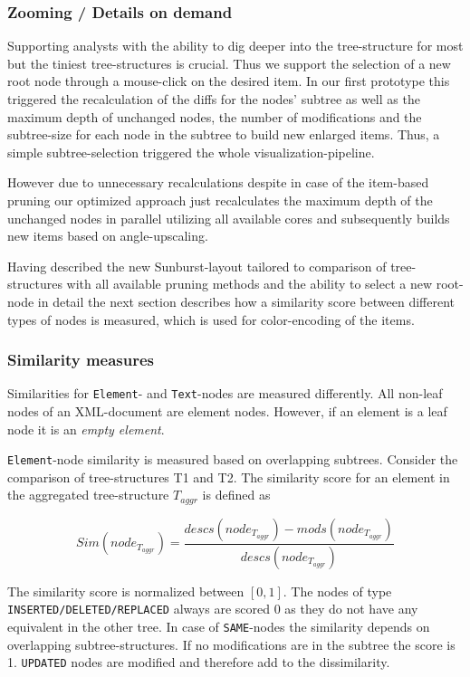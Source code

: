 \subsubsection{Zooming / Details on demand} 
Supporting analysts with the ability to dig deeper into the tree-structure for most but the tiniest tree-structures is crucial. Thus we support the selection of a new root node through a mouse-click on the desired item. In our first prototype this triggered the recalculation of the diffs for the nodes' subtree as well as the maximum depth of unchanged nodes, the number of modifications and the subtree-size for each node in the subtree to build new enlarged items. Thus, a simple subtree-selection triggered the whole visualization-pipeline.

However due to unnecessary recalculations despite in case of the item-based pruning our optimized approach just recalculates the maximum depth of the unchanged nodes in parallel utilizing all available cores and subsequently builds new items based on angle-upscaling.

Having described the new Sunburst-layout tailored to comparison of tree-structures with all available pruning methods and the ability to select a new root-node in detail the next section describes how a similarity score between different types of nodes is measured, which is used for color-encoding of the items.

\subsubsection{Similarity measures}
Similarities for \texttt{Element}- and \texttt{Text}-nodes are measured differently. All non-leaf nodes of an XML-document are element nodes. However, if an element is a leaf node it is an \emph{empty element}.

\texttt{Element}-node similarity is measured based on overlapping subtrees. Consider the comparison of tree-structures T1 and T2. The similarity score for an element in the aggregated tree-structure $T_{aggr}$ is defined as

\begin{equation}
Sim(node_{T_{aggr}}) = \frac{descs(node_{T_{aggr}}) - mods(node_{T_{aggr}})}{descs(node_{T_{aggr}})}
\end{equation}

The similarity score is normalized between $[0, 1]$. The nodes of type\\ \texttt{INSERTED/DELETED/REPLACED} always are scored 0 as they do not have any equivalent in the other tree. In case of \texttt{SAME}-nodes the similarity depends on overlapping subtree-structures. If no modifications are in the subtree the score is 1. \texttt{UPDATED} nodes are modified and therefore add to the dissimilarity.


